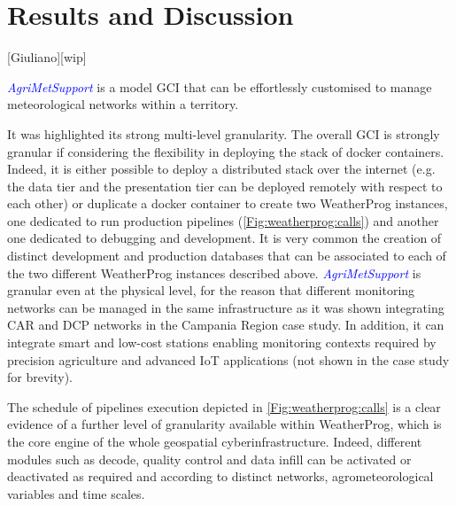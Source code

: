 \documentclass[authoryear,preprint,review,12pt]{elsarticle}
\newcommand{\update}[1]{\emph{\textcolor{blue}{#1}}}
\newcommand{\gci}{\update{AgriMetSupport}\xspace}
\begin{document}


\section{Results and Discussion}[Giuliano][wip]

\gci is a model GCI that can be effortlessly customised to manage meteorological networks within a territory.

It was highlighted its strong multi-level granularity.
The overall GCI is strongly granular if considering the flexibility in deploying the stack of docker containers.
Indeed, it is either possible to deploy a distributed stack over the internet (e.g. the data tier and the presentation tier can be deployed remotely with respect to each other) or duplicate a docker container to create two WeatherProg instances, one dedicated to run production pipelines (\cref{Fig:weatherprog:calls}) and another one dedicated to debugging and development.
It is very common the creation of distinct development and production databases that can be associated to each of the two different WeatherProg instances described above.
\gci is granular even at the physical level, for the reason that different monitoring networks can be managed in the same infrastructure as it was shown integrating CAR and DCP networks in the Campania Region case study. 
In addition, it can integrate smart and low-cost stations enabling monitoring contexts required by precision agriculture and advanced IoT applications (not shown in the case study for brevity).

The schedule of pipelines execution depicted in \cref{Fig:weatherprog:calls} is a clear evidence of a further level of granularity available within WeatherProg, which is the core engine of the whole geospatial cyberinfrastructure.
Indeed, different modules such as decode, quality control and data infill can be activated or deactivated as required and according to distinct networks, agrometeorological variables and time scales.
\end{document}
